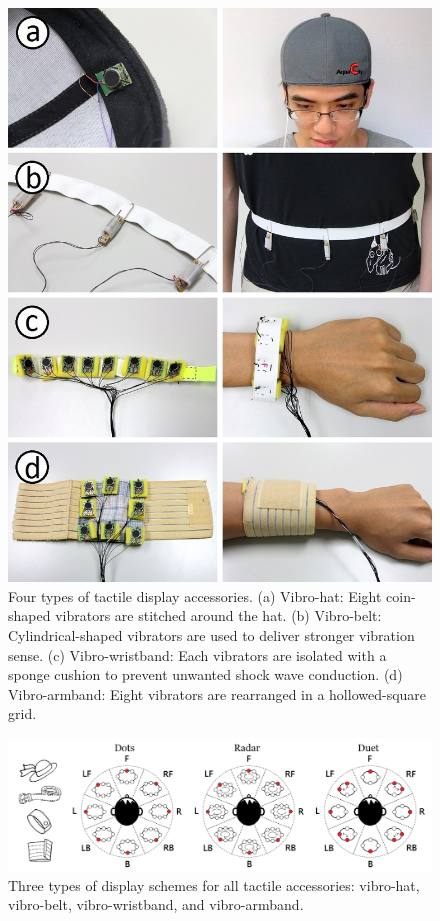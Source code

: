 \documentclass{sigchi}
\begin{document}
\begin{figure}[!t]
\centering
\includegraphics[width=0.8\columnwidth]{prototype_vibro2}
\caption{Four types of tactile display accessories. (a) Vibro-hat: Eight coin-shaped vibrators are stitched around the hat. (b) Vibro-belt: Cylindrical-shaped vibrators are used to deliver stronger vibration sense. (c) Vibro-wristband: Each vibrators are isolated with a sponge cushion to prevent unwanted shock wave conduction. (d) Vibro-armband: Eight vibrators are rearranged in a hollowed-square grid.}
\label{fig:vibration_devices}
\end{figure}

\begin{figure}[!t]
\centering
\includegraphics[width=2.0\columnwidth]{vibration_pattern_combine2}
\caption{Three types of display schemes for all tactile accessories: vibro-hat, vibro-belt, vibro-wristband, and vibro-armband.}
\label{fig:vibratin_scheme}
\end{figure}
\end{document}
